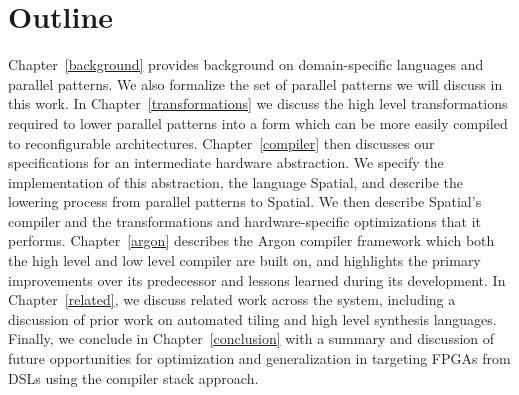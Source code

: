 \section{Outline}
Chapter~\ref{background} provides background on domain-specific languages and parallel patterns.
We also formalize the set of parallel patterns we will discuss in this work.
In Chapter~\ref{transformations} we discuss the high level transformations required to lower
parallel patterns into a form which can be more easily compiled to reconfigurable architectures.
Chapter~\ref{compiler} then discusses our specifications for an intermediate hardware abstraction.
We specify the implementation of this abstraction, the language Spatial, and describe the lowering
process from parallel patterns to Spatial.
We then describe Spatial's compiler and the transformations and hardware-specific optimizations that it performs.
Chapter~\ref{argon} describes the Argon compiler framework which both the high level and low level compiler are
built on, and highlights the primary improvements over its predecessor and lessons learned during its development.
In Chapter~\ref{related}, we discuss related work across the system, including a discussion of
prior work on automated tiling and high level synthesis languages.
Finally, we conclude in Chapter~\ref{conclusion} with a summary and discussion of future opportunities for optimization
and generalization in targeting FPGAs from DSLs using the compiler stack approach.
